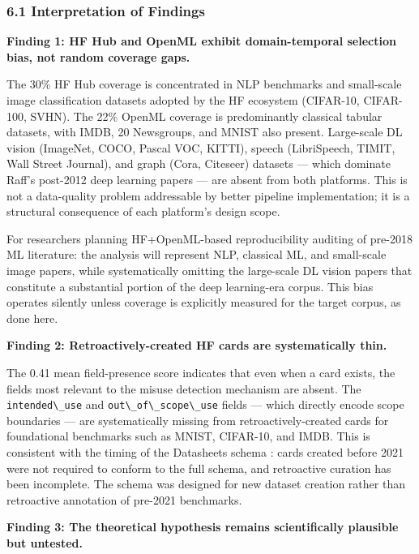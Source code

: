 
\subsubsection{6.1 Interpretation of Findings}

\textbf{Finding 1: HF Hub and OpenML exhibit domain-temporal selection bias, not random coverage gaps.}

The 30\% HF Hub coverage is concentrated in NLP benchmarks and small-scale image classification datasets adopted by the HF ecosystem (CIFAR-10, CIFAR-100, SVHN). The 22\% OpenML coverage is predominantly classical tabular datasets, with IMDB, 20 Newsgroups, and MNIST also present. Large-scale DL vision (ImageNet, COCO, Pascal VOC, KITTI), speech (LibriSpeech, TIMIT, Wall Street Journal), and graph (Cora, Citeseer) datasets --- which dominate Raff's post-2012 deep learning papers --- are absent from both platforms. This is not a data-quality problem addressable by better pipeline implementation; it is a structural consequence of each platform's design scope.

For researchers planning HF+OpenML-based reproducibility auditing of pre-2018 ML literature: the analysis will represent NLP, classical ML, and small-scale image papers, while systematically omitting the large-scale DL vision papers that constitute a substantial portion of the deep learning-era corpus. This bias operates silently unless coverage is explicitly measured for the target corpus, as done here.

\textbf{Finding 2: Retroactively-created HF cards are systematically thin.}

The 0.41 mean field-presence score indicates that even when a card exists, the fields most relevant to the misuse detection mechanism are absent. The \texttt{intended\textbackslash \_use} and \texttt{out\textbackslash \_of\textbackslash \_scope\textbackslash \_use} fields --- which directly encode scope boundaries --- are systematically missing from retroactively-created cards for foundational benchmarks such as MNIST, CIFAR-10, and IMDB. This is consistent with the timing of the Datasheets schema \citep{Gebru2021Datasheets}: cards created before 2021 were not required to conform to the full schema, and retroactive curation has been incomplete. The schema was designed for new dataset creation rather than retroactive annotation of pre-2021 benchmarks.

\textbf{Finding 3: The theoretical hypothesis remains scientifically plausible but untested.}

